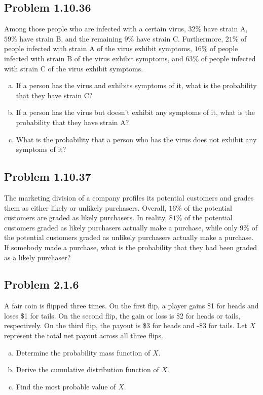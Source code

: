\documentclass{article}
\begin{document}
\subsection*{Problem 1.10.36}
Among those people who are infected with a certain virus, $32\%$ have strain A, $59\%$ have strain B, and the remaining $9\%$ have strain C. Furthermore, $21\%$ of people infected with strain A of the virus exhibit symptoms, $16\%$ of people infected with strain B of the virus exhibit symptoms, and $63\%$ of people infected with strain C of the virus exhibit symptoms.
\begin{enumerate}[(a)]
    \item If a person has the virus and exhibits symptoms of it, what is the probability that they have strain C?
    \item If a person has the virus but doesn't exhibit any symptoms of it, what is the probability that they have strain A?
    \item What is the probability that a person who has the virus does not exhibit any symptoms of it?
\end{enumerate}

\subsection*{Problem 1.10.37}
The marketing division of a company profiles its potential customers and grades them as either likely or unlikely purchasers. Overall, $16\%$ of the potential customers are graded as likely purchasers. In reality, $81\%$ of the potential customers graded as likely purchasers actually make a purchase, while only $9\%$ of the potential customers graded as unlikely purchasers actually make a purchase. If somebody made a purchase, what is the probability that they had been graded as a likely purchaser?
\subsection*{Problem 2.1.6}
A fair coin is flipped three times. On the first flip, a player gains \$1 for heads and loses \$1 for tails. On the second flip, the gain or loss is \$2 for heads or tails, respectively. On the third flip, the payout is \$3 for heads and -\$3 for tails. Let $X$ represent the total net payout across all three flips.
\begin{enumerate}[(a)]
    \item Determine the probability mass function of $X$.
    \item Derive the cumulative distribution function of $X$.
    \item Find the most probable value of $X$.
\end{enumerate}
\end{document}
